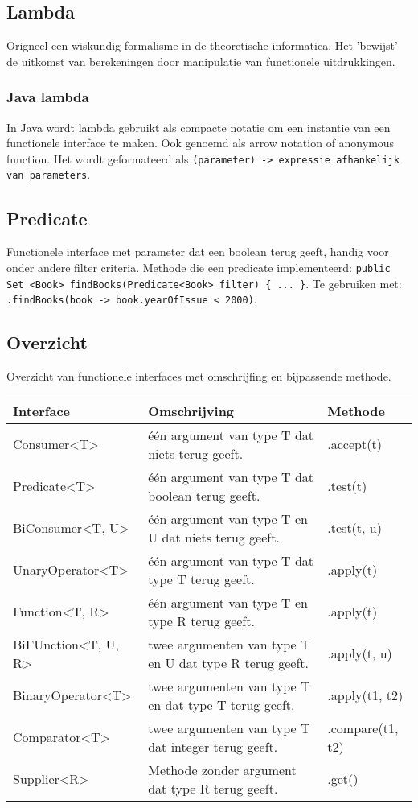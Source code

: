 \subsection{Lambda}
Origneel een wiskundig formalisme in de theoretische informatica.
Het 'bewijst' de uitkomst van berekeningen door manipulatie van functionele uitdrukkingen.

\subsubsection{Java lambda}
In Java wordt lambda gebruikt als compacte notatie om een instantie van een functionele interface te maken.
Ook genoemd als arrow notation of anonymous function.
Het wordt geformateerd als \texttt{(parameter) -> expressie afhankelijk van parameters}.

\subsection{Predicate}
Functionele interface met parameter dat een boolean terug geeft, handig voor onder andere filter criteria.
Methode die een predicate implementeerd: \texttt{public Set <Book> findBooks(Predicate<Book> filter) \{ ... \}}.
Te gebruiken met: \texttt{.findBooks(book -> book.yearOfIssue < 2000)}.

\subsection{Overzicht}
Overzicht van functionele interfaces met omschrijfing en bijpassende methode.
\begin{center}
    \begin{longtable}{lp{5cm}l}
        Interface   & Omschrijving & Methode \\
        \midrule
        Consumer<T>         & \'e\'en argument van type T dat niets terug geeft.        & .accept(t) \\
        Predicate<T>        & \'e\'en argument van type T dat boolean terug geeft.      & .test(t) \\
        BiConsumer<T, U>    & \'e\'en argument van type T en U dat niets terug geeft.   & .test(t, u) \\
        UnaryOperator<T>    & \'e\'en argument van type T dat type T terug geeft.       & .apply(t) \\
        Function<T, R>      & \'e\'en argument van type T en type R terug geeft.        & .apply(t) \\
        BiFUnction<T, U, R> & twee argumenten van type T en U dat type R terug geeft.   & .apply(t, u) \\
        BinaryOperator<T>   & twee argumenten van type T en dat type T terug geeft.     & .apply(t1, t2) \\
        Comparator<T>       & twee argumenten van type T dat integer terug geeft.       & .compare(t1, t2) \\
        Supplier<R>         & Methode zonder argument dat type R terug geeft.           & .get() \\
        \bottomrule
    \end{longtable}
\end{center}

